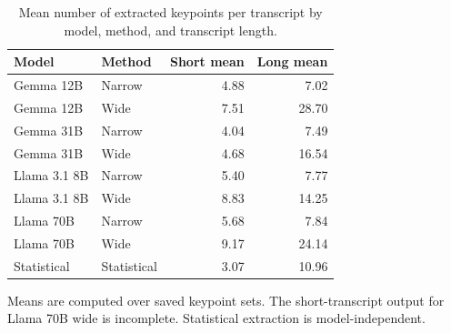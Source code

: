 \begin{table}[htbp]
\centering
\caption{Mean number of extracted keypoints per transcript by model, method, and transcript length.}
\label{tab:keypoint_count_by_model_method_length}
\begin{tabular}{llrr}
\toprule
Model & Method & Short mean & Long mean \\
\midrule
Gemma 12B & Narrow & 4.88 & 7.02 \\
Gemma 12B & Wide & 7.51 & 28.70 \\
Gemma 31B & Narrow & 4.04 & 7.49 \\
Gemma 31B & Wide & 4.68 & 16.54 \\
Llama 3.1 8B & Narrow & 5.40 & 7.77 \\
Llama 3.1 8B & Wide & 8.83 & 14.25 \\
Llama 70B & Narrow & 5.68 & 7.84 \\
Llama 70B & Wide & 9.17 & 24.14 \\
Statistical & Statistical & 3.07 & 10.96 \\
\bottomrule
\end{tabular}
\par\smallskip
{\footnotesize Means are computed over saved keypoint sets. The short-transcript output for Llama 70B wide is incomplete. Statistical extraction is model-independent.\par}
\end{table}
